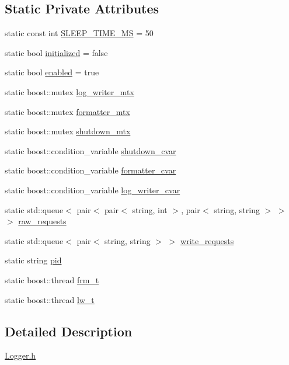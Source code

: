 \subsection*{Static Private Attributes}
\begin{DoxyCompactItemize}
\item 
static const int \hyperlink{classLogger_a7bd8d738b20738225377ac59e47792e5}{SLEEP\_\-TIME\_\-MS} = 50
\item 
static bool \hyperlink{classLogger_aef732b653322fdd9ba7b0a72e90814a4}{initialized} = false
\item 
static bool \hyperlink{classLogger_adaefa0ae12070af07bb69aed1a3d0b31}{enabled} = true
\item 
static boost::mutex \hyperlink{classLogger_a2c4c569c9b4e1d3161979e4d60545024}{log\_\-writer\_\-mtx}
\item 
static boost::mutex \hyperlink{classLogger_a5114b8ee8bc6f37b217aa8c36d5a342d}{formatter\_\-mtx}
\item 
static boost::mutex \hyperlink{classLogger_a3438c31e00d8260e58269d57e2526533}{shutdown\_\-mtx}
\item 
static boost::condition\_\-variable \hyperlink{classLogger_a62912b685f72e2782371d0867b2d23f7}{shutdown\_\-cvar}
\item 
static boost::condition\_\-variable \hyperlink{classLogger_a07fe7895664750eb3bf6b0cb39034182}{formatter\_\-cvar}
\item 
static boost::condition\_\-variable \hyperlink{classLogger_afbd56cc7017de01fc22be29f641be63a}{log\_\-writer\_\-cvar}
\item 
static std::queue$<$ pair$<$ pair$<$ string, int $>$, pair$<$ string, string $>$ $>$ $>$ \hyperlink{classLogger_aeef2780f8f49da507fb3c954a1cdae29}{raw\_\-requests}
\item 
static std::queue$<$ pair$<$ string, string $>$ $>$ \hyperlink{classLogger_ac6f7534f905bc9b903b35549fa526688}{write\_\-requests}
\item 
static string \hyperlink{classLogger_a0fe7f2c4dcb22ef87f07294f3db9d8cc}{pid}
\item 
static boost::thread \hyperlink{classLogger_a46e8969c902a456bee9802196044f582}{frm\_\-t}
\item 
static boost::thread \hyperlink{classLogger_a6214da297e928d0c9f960a249b6fcf8c}{lw\_\-t}
\end{DoxyCompactItemize}


\subsection{Detailed Description}
\hyperlink{Logger_8h}{Logger.h}

